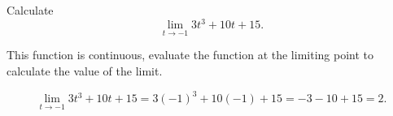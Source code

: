 \documentclass{ximera}
\author{Emma Smith Zbarsky}
\begin{document}
\begin{exercise}

Calculate \[\lim_{t\to-1}3t^3+10t+15.\]


\begin{hint}
This function is continuous, evaluate the function at the limiting point
to calculate the value of the limit.
\end{hint}


\begin{hint}
\[\lim_{t\to-1} 3t^3+10t+15 = 3(-1)^3+10(-1)+15 = -3-10+15 = 2.\]
\end{hint}


\begin{multipleChoice}
\choice{$\infty$}
\end{multipleChoice}

\end{exercise}
\end{document}
